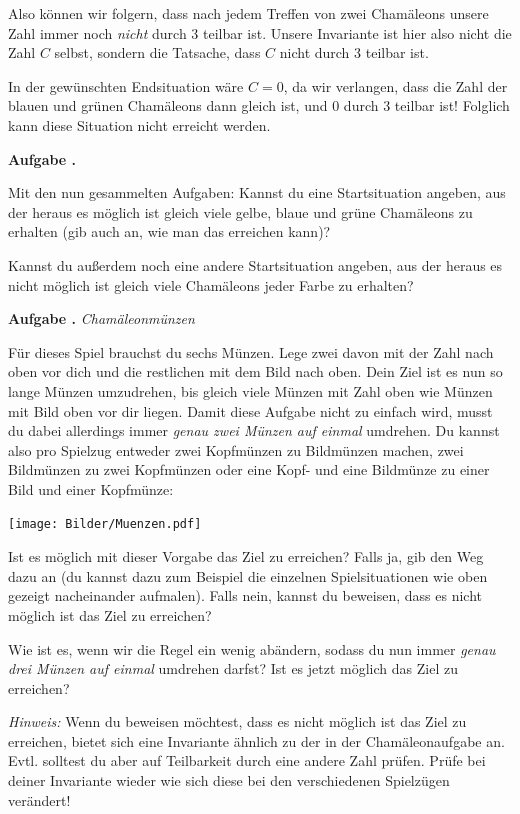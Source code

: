 \documentclass[a4paper,ngerman,12pt]{scrartcl}
\theoremstyle{definition}
\theoremstyle{plain}
\theoremstyle{remark}
\newlength{\aufgabenskip}
\newcounter{aufgabennummer}
\newenvironment{aufgabe}[1]{
	\addtocounter{aufgabennummer}{1}
	\textbf{Aufgabe \theaufgabennummer.} \emph{#1} \par
}{\vspace{\aufgabenskip}}
\begin{document}
Also können wir folgern, dass nach jedem Treffen von zwei Chamäleons unsere Zahl immer noch \emph{nicht} durch 3 teilbar ist. Unsere Invariante ist hier also nicht die Zahl $C$ selbst, sondern die Tatsache, dass $C$ nicht durch 3 teilbar ist. 

In der gewünschten Endsituation wäre $C = 0$, da wir verlangen, dass die Zahl der blauen und grünen Chamäleons dann gleich ist, und $0$ durch $3$ teilbar ist! Folglich kann diese Situation nicht erreicht werden.

\begin{aufgabe}{}
	Mit den nun gesammelten Aufgaben: Kannst du eine Startsituation angeben, aus der heraus es möglich ist gleich viele gelbe, blaue und grüne Chamäleons zu erhalten (gib auch an, wie man das erreichen kann)?
	
	Kannst du außerdem noch eine andere Startsituation angeben, aus der heraus es nicht möglich ist gleich viele Chamäleons jeder Farbe zu erhalten?
\end{aufgabe}

\begin{aufgabe}{Chamäleonmünzen}
	Für dieses Spiel brauchst du sechs Münzen. Lege zwei davon mit der Zahl nach oben vor dich und die restlichen mit dem Bild nach oben. Dein Ziel ist es nun so lange Münzen umzudrehen, bis gleich viele Münzen mit Zahl oben wie Münzen mit Bild oben vor dir liegen. Damit diese Aufgabe nicht zu einfach wird, musst du dabei allerdings immer \emph{genau zwei Münzen auf einmal } umdrehen. Du kannst also pro Spielzug entweder zwei Kopfmünzen zu Bildmünzen machen, zwei Bildmünzen zu zwei Kopfmünzen oder eine Kopf- und eine Bildmünze zu einer Bild und einer Kopfmünze:
	
	\begin{center}
		\texttt{[image: Bilder/Muenzen.pdf]}
	\end{center}
	
	Ist es möglich mit dieser Vorgabe das Ziel zu erreichen? Falls ja, gib den Weg dazu an (du kannst dazu zum Beispiel die einzelnen Spielsituationen wie oben gezeigt nacheinander aufmalen). Falls nein, kannst du beweisen, dass es nicht möglich ist das Ziel zu erreichen? 
	
	Wie ist es, wenn wir die Regel ein wenig abändern, sodass du nun immer \emph{genau drei Münzen auf einmal} umdrehen darfst? Ist es jetzt möglich das Ziel zu erreichen?
	
	\emph{Hinweis:} Wenn du beweisen möchtest, dass es nicht möglich ist das Ziel zu erreichen, bietet sich eine Invariante ähnlich zu der in der Chamäleonaufgabe an. Evtl. solltest du aber auf Teilbarkeit durch eine andere Zahl prüfen. Prüfe bei deiner Invariante wieder wie sich diese bei den verschiedenen Spielzügen verändert!
\end{aufgabe}
\end{document}

